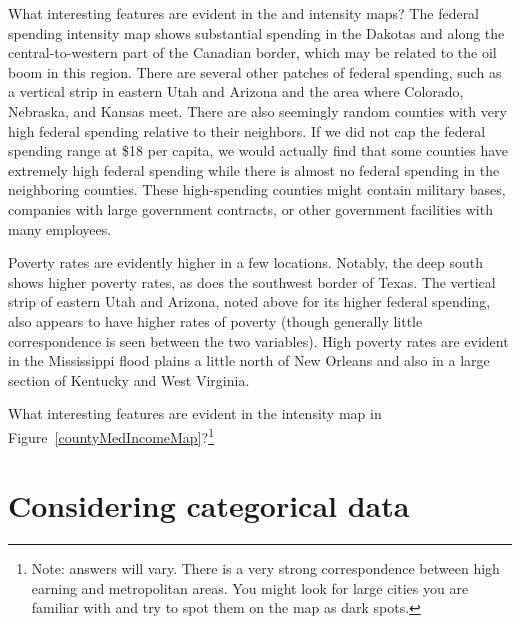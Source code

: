 \textC{\pagebreak}

\begin{example}{What interesting features are evident in the  and  intensity maps?}
The federal spending intensity map shows substantial spending in the Dakotas and along the central-to-western part of the Canadian border, which may be related to the oil boom in this region. There are several other patches of federal spending, such as a vertical strip in eastern Utah and Arizona and the area where Colorado, Nebraska, and Kansas meet. There are also seemingly random counties with very high federal spending relative to their neighbors. If we did not cap the federal spending range at \$18 per capita, we would actually find that some counties have extremely high federal spending while there is almost no federal spending in the neighboring counties. These high-spending counties might contain military bases, companies with large government contracts, or other government facilities with many employees.

Poverty rates are evidently higher in a few locations. Notably, the deep south shows higher poverty rates, as does the southwest border of Texas. The vertical strip of eastern Utah and Arizona, noted above for its higher federal spending, also appears to have higher rates of poverty (though generally little correspondence is seen between the two variables).  High poverty rates are evident in the Mississippi flood plains a little north of New Orleans and also in a large section of Kentucky and West Virginia.
\end{example}

\begin{exercise}
What interesting features are evident in the  intensity map in Figure~\ref{countyMedIncomeMap}?\footnote{Note: answers will vary. There is a very strong correspondence between high earning and metropolitan areas. You might look for large cities you are familiar with and try to spot them on the map as dark spots.}
\end{exercise}




\textC{\newpage}

\section[Considering categorical data]{Considering categorical data }
\label{categoricalData}

